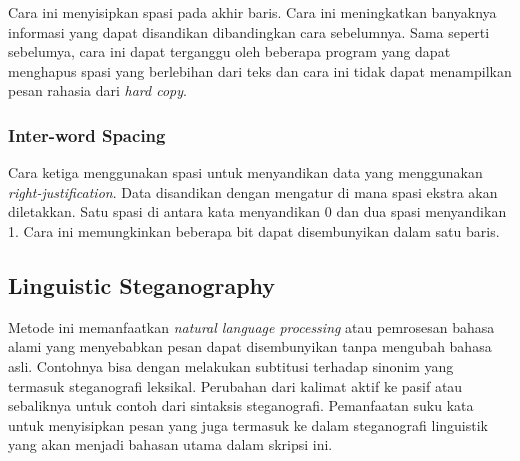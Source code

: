 Cara ini menyisipkan spasi pada akhir baris. Cara ini meningkatkan banyaknya informasi yang dapat disandikan dibandingkan cara sebelumnya. Sama seperti sebelumya, cara ini dapat terganggu oleh beberapa program yang dapat menghapus spasi yang berlebihan dari teks dan cara ini tidak dapat menampilkan pesan rahasia dari \textit{hard copy}.

\subsubsection{Inter-word Spacing}

Cara ketiga menggunakan spasi untuk menyandikan data yang menggunakan \textit{right-justification}. Data disandikan dengan mengatur di mana spasi ekstra akan diletakkan. Satu spasi di antara kata menyandikan 0 dan dua spasi menyandikan 1. Cara ini memungkinkan beberapa bit dapat disembunyikan dalam satu baris.

\subsection{Linguistic Steganography}
Metode ini memanfaatkan \textit{natural language processing} atau pemrosesan bahasa alami yang menyebabkan pesan dapat disembunyikan tanpa mengubah bahasa asli. Contohnya bisa dengan melakukan subtitusi terhadap sinonim yang termasuk steganografi leksikal. Perubahan dari kalimat aktif ke pasif atau sebaliknya untuk contoh dari sintaksis steganografi. Pemanfaatan suku kata untuk menyisipkan pesan yang juga termasuk ke dalam steganografi linguistik yang akan menjadi bahasan utama dalam skripsi ini.